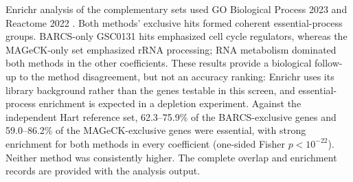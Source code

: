 Enrichr analysis of the complementary sets used GO Biological Process 2023
and Reactome 2022 \citep{chen2013enrichr}.  Both methods' exclusive hits formed
coherent essential-process groups.  BARCS-only GSC0131 hits emphasized cell
cycle regulators, whereas the MAGeCK-only set emphasized rRNA processing; RNA
metabolism dominated both methods in the other coefficients.  These results
provide a biological follow-up to the method disagreement, but not an accuracy
ranking: Enrichr uses its library background rather than the genes testable in
this screen, and essential-process enrichment is expected in a depletion
experiment.  Against the independent Hart reference set, 62.3--75.9\% of the
BARCS-exclusive genes and 59.0--86.2\% of the MAGeCK-exclusive genes were
essential, with strong enrichment for both methods in every coefficient
(one-sided Fisher $p<10^{-22}$).  Neither method was consistently higher.  The
complete overlap and enrichment records are provided with the analysis output.
